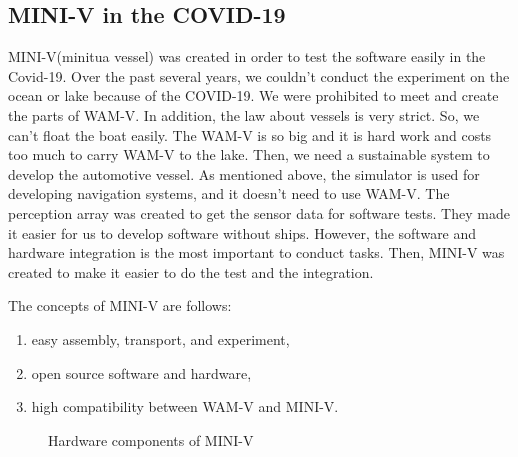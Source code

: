 \documentclass[lettersize,journal]{IEEEtran}
\begin{document}
\subsection{MINI-V in the COVID-19}
MINI-V(minitua vessel) was created in order to test the software easily in the Covid-19. Over the past several years, 
we couldn't conduct the experiment on the ocean or lake because of the COVID-19.
We were prohibited to meet and create the parts of WAM-V.
In addition, the law about vessels is very strict.
So, we can't float the boat easily. The WAM-V is so big and it is hard work and costs too much to carry WAM-V to the lake. 
Then, we need a sustainable system to develop the automotive vessel.
As mentioned above, the simulator is used for developing navigation systems, and it doesn't need to use WAM-V.
The perception array was created to get the sensor data for software tests. They made it easier for us to develop software without ships.
However, the software and hardware integration is the most important to conduct tasks. Then, MINI-V was created 
to make it easier to do the test and the integration.

The concepts of MINI-V are follows:
\begin{enumerate}
  \item easy assembly, transport, and experiment,
  \item open source software and hardware,
  \item high compatibility between WAM-V and MINI-V.
\end{enumerate}

\begin{figure}[htbp]
    \begin{center}
  \end{center}
  \caption{Hardware components of MINI-V}
  \label{fig:mini_v_component}
\end{figure}
\end{document}
